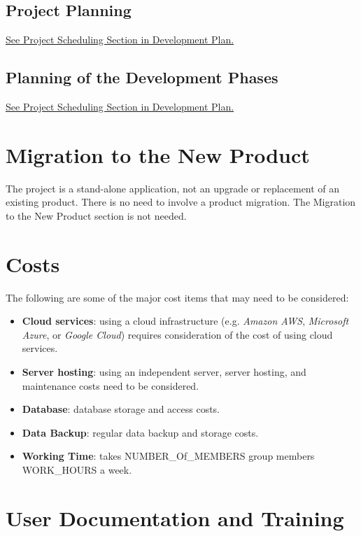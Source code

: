 \documentclass[12pt]{article}
\begin{document}
\subsection{Project Planning}
\href{https://github.com/wangq131/4G06CapstoneProjectT5/blob/main/docs/DevelopmentPlan/DevelopmentPlan.tex#L248C1-L265C6}{See Project Scheduling Section in Development Plan.}
\subsection{Planning of the Development Phases}
\href{https://github.com/wangq131/4G06CapstoneProjectT5/blob/main/docs/DevelopmentPlan/DevelopmentPlan.tex#L194C1-L245C16}{See Project Scheduling Section in Development Plan.}

\section{Migration to the New Product}
The project is a stand-alone application, not an upgrade or replacement of an existing product. There is no need to involve a product migration. The Migration to the New Product section is not needed.

\section{Costs}
The following are some of the major cost items that may need to be considered:

\begin{itemize} 
  \item \textbf{Cloud services}: using a cloud infrastructure (e.g. \textit{Amazon AWS}, \textit{Microsoft Azure}, or \textit{Google Cloud}) requires consideration of the cost of using cloud services.
  \item \textbf{Server hosting}: using an independent server, server hosting, and maintenance costs need to be considered.
  \item \textbf{Database}: database storage and access costs.
  \item \textbf{Data Backup}: regular data backup and storage costs.
  \item \textbf{Working Time}: takes NUMBER\_Of\_MEMBERS group members WORK\_HOURS a week.
\end{itemize}

\section{User Documentation and Training}
\end{document}
